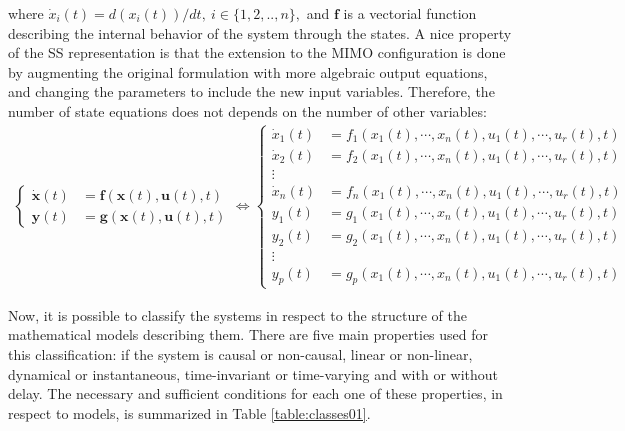 \documentclass[a4paper,11pt]{book}
\numberwithin{figure}{chapter}
\numberwithin{equation}{chapter}
\numberwithin{table}{chapter}
\theoremstyle{definition}
\begin{document}
\noindent where $\dot{x}_i(t) = d(x_i(t))/dt,\ i \in \{1,2,..,n\},$ and $\bm{f}$ is a vectorial function describing the internal behavior of the system through the states. A nice property of the SS representation is that the extension to the MIMO configuration is done by augmenting the original formulation with more algebraic output equations, and changing the parameters to include the new input variables. Therefore, the number of state equations does not depends on the number of other variables:
\begin{align} \label{eq:SSRepr02}
\begin{cases}
	\dot{\bm{x}}(t) &= \bm{f}(\bm{x}(t), \bm{u}(t), t) \\
	\bm{y}(t) &= \bm{g}(\bm{x}(t), \bm{u}(t), t) 	
\end{cases} \Leftrightarrow \begin{cases}
	\dot{x}_1(t) &= f_1(x_1(t), \cdots, x_n(t), u_1(t), \cdots, u_r(t), t) \\
	\dot{x}_2(t) &= f_2(x_1(t), \cdots, x_n(t), u_1(t), \cdots, u_r(t), t) \\
	 \vdots \\
	\dot{x}_n(t) &= f_n(x_1(t), \cdots, x_n(t), u_1(t), \cdots, u_r(t), t) \\
	y_1(t) &= g_1(x_1(t), \cdots, x_n(t), u_1(t), \cdots, u_r(t), t) \\
	y_2(t) &= g_2(x_1(t), \cdots, x_n(t), u_1(t), \cdots, u_r(t), t) \\
	\vdots \\
	y_p(t) &= g_p(x_1(t), \cdots, x_n(t), u_1(t), \cdots, u_r(t), t) 
\end{cases}
\end{align}

Now, it is possible to classify the systems in respect to the structure of the mathematical models describing them. There are five main properties used for this classification: if the system is causal or non-causal, linear or non-linear, dynamical or instantaneous, time-invariant or time-varying and with or without delay. The necessary and sufficient conditions for each one of these properties, in respect to models, is summarized in Table \ref{table:classes01}.
\end{document}
